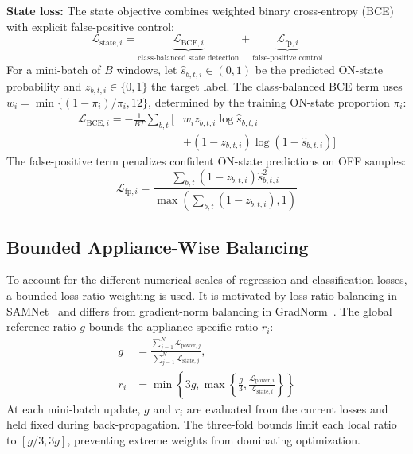 \documentclass[journal]{IEEEtran}
\begin{document}
\textbf{State loss:}
The state objective combines weighted binary cross-entropy (BCE) with explicit false-positive control:
\begin{equation}
\mathcal{L}_{\mathrm{state},i}=
\underbrace{\mathcal{L}_{\mathrm{BCE},i}}_{\text{class-balanced state detection}}
+\underbrace{\mathcal{L}_{\mathrm{fp},i}}_{\text{false-positive control}}
\label{eq:state-loss}
\end{equation}
For a mini-batch of $B$ windows, let $\hat s_{b,t,i}\in(0,1)$ be the predicted ON-state probability and $z_{b,t,i}\in\{0,1\}$ the target label. The class-balanced BCE term uses $w_i=\min\{(1-\pi_i)/\pi_i,12\}$, determined by the training ON-state proportion $\pi_i$:
\begin{equation}
\begin{aligned}
\mathcal{L}_{\mathrm{BCE},i}=-\frac{1}{BT}\sum_{b,t}\bigl[&
w_i z_{b,t,i}\log\hat s_{b,t,i}\\
&+(1-z_{b,t,i})\log(1-\hat s_{b,t,i})\bigr]
\end{aligned}
\label{eq:weighted-bce}
\end{equation}
The false-positive term penalizes confident ON-state predictions on OFF samples:
\begin{equation}
\mathcal{L}_{\mathrm{fp},i}=
\frac{\sum_{b,t}(1-z_{b,t,i})\hat s_{b,t,i}^{2}}
{\max\left(\sum_{b,t}(1-z_{b,t,i}),1\right)}
\label{eq:false-positive-loss}
\end{equation}

\subsection{Bounded Appliance-Wise Balancing}
\label{sec:balancing}

To account for the different numerical scales of regression and classification losses, a bounded loss-ratio weighting is used. It is motivated by loss-ratio balancing in SAMNet~\cite{liu2022samnet} and differs from gradient-norm balancing in GradNorm~\cite{chen2018gradnorm}. The global reference ratio $g$ bounds the appliance-specific ratio $r_i$:
\begin{equation}
\begin{aligned}
g&=
\frac{\sum_{j=1}^{N}\mathcal{L}_{\mathrm{power},j}}
{\sum_{j=1}^{N}\mathcal{L}_{\mathrm{state},j}},\\[-1pt]
r_i&=\min\!\left\{3g,\max\!\left\{
\frac{g}{3},
\frac{\mathcal{L}_{\mathrm{power},i}}
{\mathcal{L}_{\mathrm{state},i}}
\right\}\right\}
\end{aligned}
\label{eq:balanced-ratio}
\end{equation}
At each mini-batch update, $g$ and $r_i$ are evaluated from the current losses and held fixed during back-propagation. The three-fold bounds limit each local ratio to $[g/3,3g]$, preventing extreme weights from dominating optimization.
\end{document}
